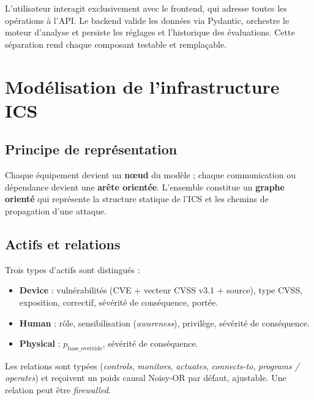 \documentclass[12pt,a4paper]{article}
\newcommand{\forcereset}[1]{}
\begin{document}
L'utilisateur interagit exclusivement avec le frontend, qui adresse toutes les opérations à l'API. Le backend valide les données via Pydantic, orchestre le moteur d'analyse et persiste les réglages et l'historique des évaluations. Cette séparation rend chaque composant testable et remplaçable.

\section{Modélisation de l'infrastructure ICS}
\forcereset{6}

\subsection{Principe de représentation}
\forcereset{4}

Chaque équipement devient un \textbf{nœud} du modèle ; chaque communication ou dépendance devient une \textbf{arête orientée}. L'ensemble constitue un \textbf{graphe orienté} qui représente la structure statique de l'ICS et les chemins de propagation d'une attaque.

\subsection{Actifs et relations}
\forcereset{5}

Trois types d'actifs sont distingués :

\begin{itemize}[leftmargin=1.2cm, itemsep=0.2\baselineskip]
    \item \textbf{Device} : vulnérabilités (CVE + vecteur CVSS v3.1 + source), type CVSS, exposition, correctif, sévérité de conséquence, portée.
    \item \textbf{Human} : rôle, sensibilisation (\emph{awareness}), privilège, sévérité de conséquence.
    \item \textbf{Physical} : $p_{\text{base\_override}}$, sévérité de conséquence.
\end{itemize}

Les relations sont typées (\emph{controls}, \emph{monitors}, \emph{actuates}, \emph{connects-to}, \emph{programs / operates}) et reçoivent un poids causal Noisy-OR par défaut, ajustable. Une relation peut être \emph{firewalled}.
\end{document}
